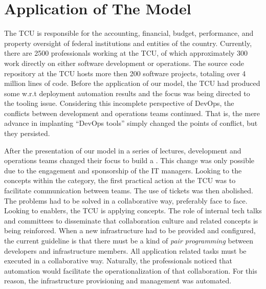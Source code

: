 \section{Application of The Model} \label{sec:tcu}

The TCU is responsible for the accounting, financial, budget, performance, and property
oversight of federal institutions and entities of the country. Currently, there are 2500
professionals working at the TCU, of which approximately 300 work directly on either
software development or operations. The source code repository at the TCU hosts more then 200 software projects, totaling
over 4 million lines of code.
Before the application of our model, the TCU had produced some w.r.t deployment
automation results and the focus was being directed to the tooling issue. Considering this
incomplete perspective of DevOps, the conflicts between development and operations
teams continued. That is, the mere advance in implanting ``DevOps tools'' simply
changed the points of conflict, but they persisted.

After the presentation of our  model in a series of lectures, development and
operations teams changed their focus to build a \cc. This
change was only possible due to the engagement and sponsorship of the IT
managers. Looking to the concepts within the \cc category, the first practical
action at the TCU was to facilitate communication between teams. The use of tickets
was then abolished. The problems had to be solved in a collaborative way, preferably
face to face.
Looking to enablers, the TCU is applying  concepts.
The role of internal tech talks and committees to disseminate that collaboration
culture and related concepts is being reinforced.
When a new infrastructure had to be provided and configured, the current guideline is
that there must be a kind of \emph{pair programming} between developers and infrastructure
members. All application related tasks must be executed in a collaborative
way. Naturally, the professionals noticed that automation would facilitate the
operationalization of that collaboration. For this reason, the infrastructure provisioning
and management was automated.

